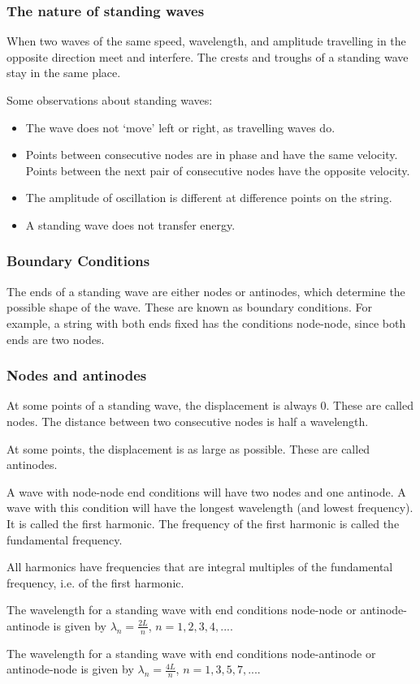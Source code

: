\subsubsection{The nature of standing waves}
When two waves of the same speed, wavelength, and amplitude travelling in the
opposite direction meet and interfere. The crests and troughs of a standing
wave stay in the same place.

Some observations about standing waves:
\begin{itemize}
    \item The wave does not `move' left or right, as travelling waves do.
    \item Points between consecutive nodes are in phase and have the same
        velocity. Points between the next pair of consecutive nodes have the
        opposite velocity.
    \item The amplitude of oscillation is different at difference points on
        the string.
    \item A standing wave does not transfer energy.
\end{itemize}

\subsubsection{Boundary Conditions}
The ends of a standing wave are either nodes or antinodes, which determine the
possible shape of the wave. These are known as boundary conditions. For
example, a string with both ends fixed has the conditions node-node, since
both ends are two nodes.

\subsubsection{Nodes and antinodes}
At some points of a standing wave, the displacement is always 0. These are
called nodes. The distance between two consecutive nodes is half a wavelength.

At some points, the displacement is as large as possible. These are called
antinodes.

A wave with node-node end conditions will have two nodes and one antinode. A
wave with this condition will have the longest wavelength (and lowest
frequency). It is called the first harmonic. The frequency of the first
harmonic is called the fundamental frequency.

All harmonics have frequencies that are integral multiples of the fundamental
frequency, i.e. of the first harmonic.

The wavelength for a standing wave with end conditions node-node or
antinode-antinode is given by $\lambda_n = \frac{2L}{n}$, $n = 1,2,3,4, ...$.

The wavelength for a standing wave with end conditions node-antinode or
antinode-node is given by $\lambda_n = \frac{4L}{n}$, $n = 1,3,5,7, ...$.


